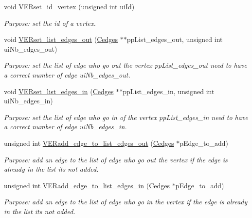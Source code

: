\begin{DoxyCompactItemize}
void \hyperlink{class_cvertex_a6d76189e22c29a74cbae5a9a3507c312}{V\+E\+Rset\+\_\+id\+\_\+vertex} (unsigned int ui\+Id)
\begin{DoxyCompactList}\small\item\em Purpose\+: set the id of a vertex. \end{DoxyCompactList}\item 
void \hyperlink{class_cvertex_a0816cd7d37fe2ae4e6d347c98b5d603c}{V\+E\+Rset\+\_\+list\+\_\+edges\+\_\+out} (\hyperlink{class_cedges}{Cedges} $\ast$$\ast$pp\+List\+\_\+edges\+\_\+out, unsigned int ui\+Nb\+\_\+edges\+\_\+out)
\begin{DoxyCompactList}\small\item\em Purpose\+: set the list of edge who go out the vertex pp\+List\+\_\+edges\+\_\+out need to have a correct number of edge ui\+Nb\+\_\+edges\+\_\+out. \end{DoxyCompactList}\item 
void \hyperlink{class_cvertex_a08f128a8c3988e24e62806f6655b4a37}{V\+E\+Rset\+\_\+list\+\_\+edges\+\_\+in} (\hyperlink{class_cedges}{Cedges} $\ast$$\ast$pp\+List\+\_\+edges\+\_\+in, unsigned int ui\+Nb\+\_\+edges\+\_\+in)
\begin{DoxyCompactList}\small\item\em Purpose\+: set the list of edge who go in of the vertex pp\+List\+\_\+edges\+\_\+in need to have a correct number of edge ui\+Nb\+\_\+edges\+\_\+in. \end{DoxyCompactList}\item 
unsigned int \hyperlink{class_cvertex_ac2a86a2638f4b4ac43c9937aa76671a8}{V\+E\+Radd\+\_\+edge\+\_\+to\+\_\+list\+\_\+edges\+\_\+out} (\hyperlink{class_cedges}{Cedges} $\ast$p\+Edge\+\_\+to\+\_\+add)
\begin{DoxyCompactList}\small\item\em Purpose\+: add an edge to the list of edge who go out the vertex if the edge is already in the list it\textquotesingle{}s not added. \end{DoxyCompactList}\item 
unsigned int \hyperlink{class_cvertex_a49f2c7dde7f059ba1a03f60cac1dbecf}{V\+E\+Radd\+\_\+edge\+\_\+to\+\_\+list\+\_\+edges\+\_\+in} (\hyperlink{class_cedges}{Cedges} $\ast$p\+Edge\+\_\+to\+\_\+add)
\begin{DoxyCompactList}\small\item\em Purpose\+: add an edge to the list of edge who go in the vertex if the edge is already in the list it\textquotesingle{}s not added. \end{DoxyCompactList}\item 

\end{DoxyCompactItemize}
